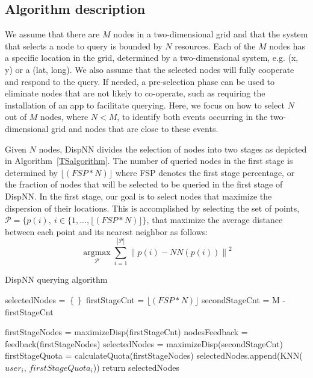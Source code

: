 \documentclass{acm_proc_article-sp}
\newcommand\floor[1]{\lfloor#1\rfloor}
\DeclareMathOperator*{\argmax}{argmax}
\newcommand{\norm}[1]{\left\lVert #1 \right\rVert}
\begin{document}
\subsection{Algorithm description}
We assume that there are $M$ nodes in a two-dimensional grid and that the system that selects a node to query is bounded by $N$ resources. Each of the $M$ nodes has a specific location in the grid, determined by a two-dimensional system, e.g. (x, y) or a (lat, long). We also assume that the selected nodes will fully cooperate and respond to the query. If needed, a pre-selection phase can be used to eliminate nodes that are not likely to co-operate, such as requiring the installation of an app to facilitate querying. Here, we focus on how to select $N$ out of $M$ nodes, where $N < M$, to identify both events occurring in the two-dimensional grid and nodes that are close to these events.\par

Given $N$ nodes, DispNN divides the selection of nodes into two stages as depicted in Algorithm~\ref{TSalgorithm}. The number of queried nodes in the first stage is determined by $\floor{(FSP*N)}$ where FSP denotes the first stage percentage, or the fraction of nodes that will be selected to be queried in the first stage of DispNN. In the first stage, our goal is to select nodes that maximize the dispersion of their locations. This is accomplished by selecting the set of points, $\mathcal{P} = \{ p(i), \ i \in \{ 1,..., \floor{(FSP*N)} \}$, that maximize the average distance between each point and its nearest neighbor as follows:
\begin{equation} \label{eq:maxDisp}
\argmax\limits_{\mathcal{P}} \sum_{i=1}^{|\mathcal{P} |} \norm{p(i) - NN(p(i))}^2
\end{equation}


\begin{algorithm}[!b]
\caption{DispNN querying algorithm}
\label{TSalgorithm}
\begin{algorithmic}[1]
      \State selectedNodes = $\left\{\right\}$
      \State firstStageCnt = $\floor{(FSP*N)}$
      \State secondStageCnt = M - firstStageCnt
      
      \State firstStageNodes = maximizeDisp(firstStageCnt) 
      \State nodesFeedback = feedback(firstStageNodes)  
           
             \State selectedNodes = maximizeDisp(secondStageCnt){}
      \Else
        	\State firstStageQuota = calculateQuota(firstStageNodes) 
	   \State selectedNodes.append(KNN($user_i$, $firstStageQuota_i$))  
		\EndFor
 		\EndIf 
\State return {selectedNodes}
\EndFunction
\end{algorithmic}
\end{algorithm}
\end{document}
